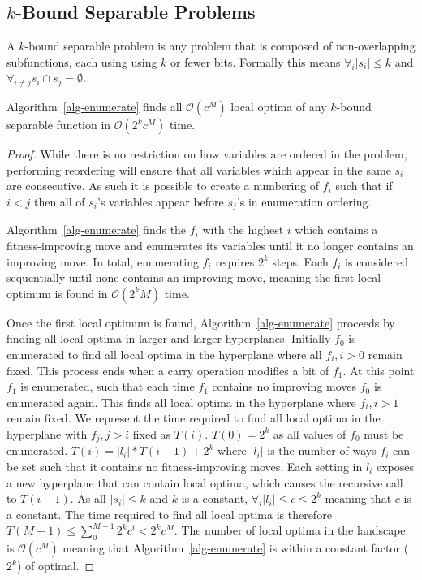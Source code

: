 \documentclass[runningheads,a4paper]{llncs}
\newcommand{\BigO}[1]{$\mathcal{O}{(#1)}$}
\begin{document}
\subsection{$k$-Bound Separable Problems}
A $k$-bound separable problem is any problem that is composed of non-overlapping
subfunctions, each using using $k$ or fewer bits. Formally this means
$\forall_i |s_i| \leq k$ and $\forall_{i \neq j} s_i \cap s_j = \emptyset$.

\begin{theorem}
Algorithm~\ref{alg-enumerate} finds all \BigO{c^{M}} local optima of any $k$-bound separable function
in \BigO{2^kc^{M}} time.
\end{theorem}

\begin{proof}
While there is no restriction on how variables are ordered in the problem,
performing reordering will ensure that
all variables which appear in the same $s_i$ are consecutive.
As such it is possible to create a numbering of $f_i$ such that if $i < j$ then all of $s_i$'s
variables appear before $s_j$'s in enumeration ordering.

Algorithm~\ref{alg-enumerate} finds the $f_i$ with the highest $i$ which contains a
fitness-improving move and enumerates its variables until it no longer
contains an improving move. In total, enumerating $f_i$ requires $2^k$
steps. Each $f_i$ is considered sequentially until none contains an improving move,
meaning the first local optimum is found in \BigO{2^kM} time.

Once the first local optimum is found, Algorithm~\ref{alg-enumerate} proceeds
by finding all local optima in larger and larger hyperplanes. Initially $f_0$
is enumerated to find all local optima in the hyperplane where all $f_i, i>0$ remain
fixed. This process ends when a carry operation modifies a bit of $f_1$. At
this point $f_1$ is enumerated, such that each time $f_1$ contains no improving moves
$f_0$ is enumerated again. This finds all local optima in the hyperplane where $f_i, i>1$ remain
fixed. We represent the time required to find all local optima in the hyperplane
with $f_j, j>i$ fixed as $T(i)$. $T(0)=2^k$ as all values of $f_0$ must be enumerated.
$T(i) = |l_i|*T(i-1)+2^k$ where $|l_i|$ is the number of ways $f_i$ can be set such
that it contains no fitness-improving moves.
Each setting in $l_i$ exposes a new hyperplane
that can contain local optima, which causes the recursive call to $T(i-1)$.
As all $|s_i| \leq k$ and $k$ is a
constant, $\forall_i |l_i| \leq c \leq 2^k$ meaning that $c$ is a constant.
The time required to find all local optima is therefore
$T(M-1)\leq \sum_0^{M-1}2^kc^i<2^kc^{M}$.
The number of local optima in the landscape is \BigO{c^{M}} meaning that Algorithm~\ref{alg-enumerate}
is within a constant factor ($2^k$) of optimal.
\end{proof}
\end{document}
